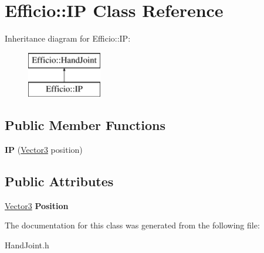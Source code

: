 \hypertarget{class_efficio_1_1_i_p}{}\section{Efficio\+:\+:IP Class Reference}
\label{class_efficio_1_1_i_p}
Inheritance diagram for Efficio\+:\+:IP\+:\begin{figure}[H]
\begin{center}
\leavevmode
\includegraphics[height=2.000000cm]{class_efficio_1_1_i_p}
\end{center}
\end{figure}
\subsection*{Public Member Functions}
\begin{DoxyCompactItemize}
\item 
{\bfseries IP} (\hyperlink{class_efficio_1_1_vector3}{Vector3} position)\hypertarget{class_efficio_1_1_i_p_a531c41633c47e34b57b261860b3d0182}{}\label{class_efficio_1_1_i_p_a531c41633c47e34b57b261860b3d0182}

\end{DoxyCompactItemize}
\subsection*{Public Attributes}
\begin{DoxyCompactItemize}
\item 
\hyperlink{class_efficio_1_1_vector3}{Vector3} {\bfseries Position}\hypertarget{class_efficio_1_1_i_p_a7475835f031849532d8e31f2d392096a}{}\label{class_efficio_1_1_i_p_a7475835f031849532d8e31f2d392096a}

\end{DoxyCompactItemize}


The documentation for this class was generated from the following file\+:\begin{DoxyCompactItemize}
\item 
Hand\+Joint.\+h\end{DoxyCompactItemize}
